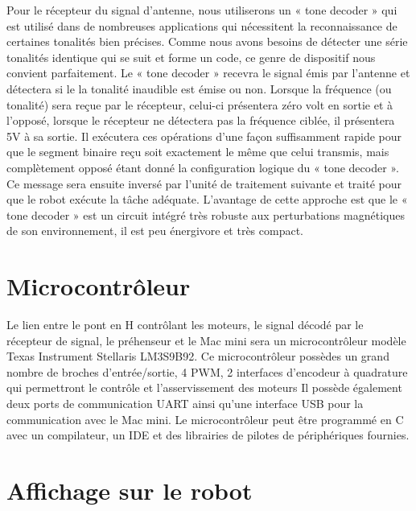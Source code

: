 Pour le récepteur du signal d’antenne, nous utiliserons un « tone decoder » qui est utilisé dans de nombreuses applications qui nécessitent la reconnaissance de certaines tonalités bien précises. Comme nous avons besoins de détecter une série tonalités identique qui se suit et forme un code, ce genre de dispositif nous convient parfaitement. Le « tone decoder » recevra le signal émis par l’antenne et détectera si le la tonalité inaudible est émise ou non. Lorsque la fréquence (ou tonalité) sera reçue par le récepteur, celui-ci présentera zéro volt en sortie et à l’opposé, lorsque le récepteur ne détectera pas la fréquence ciblée, il présentera 5V à sa sortie. Il exécutera ces opérations d’une façon suffisamment rapide pour que le segment binaire reçu soit exactement le même que celui transmis, mais complètement opposé étant donné la configuration logique du « tone decoder ».  Ce message sera ensuite inversé par l’unité de traitement suivante et traité pour que le robot exécute la tâche adéquate. L’avantage de cette approche est que le « tone decoder » est un circuit intégré très robuste aux perturbations magnétiques de son environnement, il est peu énergivore et très compact.

\section{Microcontrôleur} \label{s:micro}

Le lien entre le pont en H contrôlant les moteurs, le signal décodé par le récepteur de signal, le préhenseur et le Mac mini sera un microcontrôleur modèle Texas Instrument Stellaris LM3S9B92. Ce microcontrôleur possèdes un grand nombre de broches d'entrée/sortie, 4 PWM, 2 interfaces d'encodeur à quadrature qui permettront le contrôle et l'asservissement des moteurs Il possède également deux ports de communication UART ainsi qu'une interface USB pour la communication avec le Mac mini. Le microcontrôleur peut être programmé en C avec un compilateur, un IDE et des librairies de pilotes de périphériques fournies.   

\section{Affichage sur le robot} \label{s:LCD}

